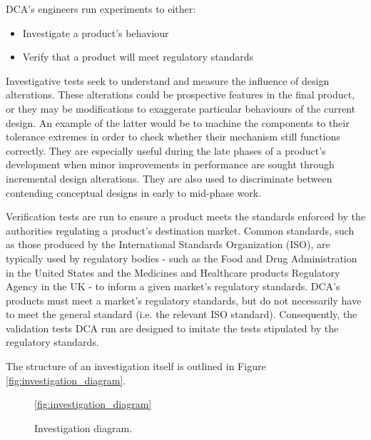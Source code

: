 \documentclass[11pt,a4paper,article]{memoir} %
\begin{document}
\par
DCA's engineers run experiments to either:
\begin{itemize}
	\item Investigate a product's behaviour
	\item Verify that a product will meet regulatory standards
\end{itemize}
Investigative tests seek to understand and measure the influence of design alterations. These alterations could be prospective features in the final product, or they may be modifications to exaggerate particular behaviours of the current design. An example of the latter would be to machine the components to their tolerance extremes in order to check whether their mechanism still functions correctly. They are especially useful during the late phases of a product's development when minor improvements in performance are sought through incremental design alterations. They are also used to discriminate between contending conceptual designs in early to mid-phase work.
\par
Verification tests are run to ensure a product meets the standards enforced by the authorities regulating a product's destination market. Common standards, such as those produced by the International Standards Organization (ISO), are typically used by regulatory bodies - such as the Food and Drug Administration in the United States and the Medicines and Healthcare products Regulatory Agency in the UK - to inform a given market's regulatory standards. DCA's products must meet a market's regulatory standards, but do not necessarily have to meet the general standard (i.e. the relevant ISO standard).  Consequently, the validation tests DCA run are designed to imitate the tests stipulated by the regulatory standards.
\par
The structure of an investigation itself is outlined in Figure \ref{fig:investigation_diagram}. 
\begin{figure}
\ref{fig:investigation_diagram}
\caption{Investigation diagram.}
\end{figure}


\end{document}
